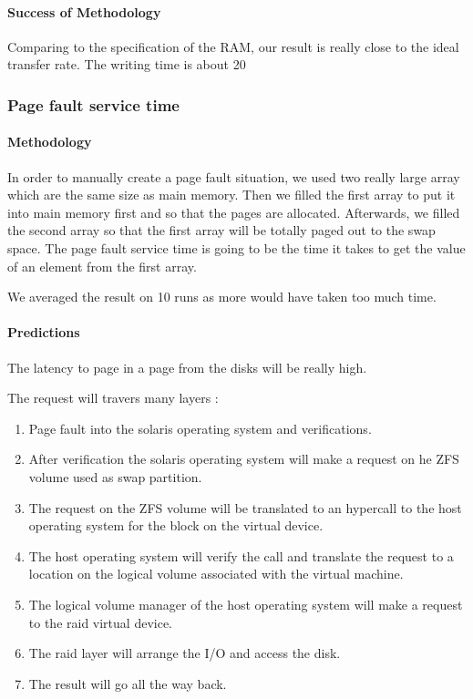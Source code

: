 \paragraph{Success of Methodology}
Comparing to the specification of the RAM, our result is really close to the ideal transfer rate. The writing time is about 20%



\subsubsection{Page fault service time}
\paragraph{Methodology}
In order to manually create a page fault situation, we used two really large array which are the same size as main memory.
Then we filled the first array to put it into main memory first and so that the pages are allocated.
Afterwards, we filled the second array so that the first array will be totally paged out to the swap space.
The page fault service time is going to be the time it takes to get the value of an element from the first array.

We averaged the result on 10 runs as more would have taken too much time.

\paragraph{Predictions}
The latency to page in a page from the disks will be really high.

The request will travers many layers :
\begin{enumerate}
\item Page fault into the solaris operating system and verifications.
\item After verification the solaris operating system will make a request on
he ZFS volume used as swap partition.
\item The request on the ZFS volume will be translated to an hypercall to the
host operating system for the block on the virtual device.
\item The host operating system will verify the call and translate the request
to a location on the logical volume associated with the virtual machine.
\item The logical volume manager of the host operating system will make a
request to the raid virtual device.
\item The raid layer will arrange the I/O and access the disk.
\item The result will go all the way back.
\end{enumerate}

